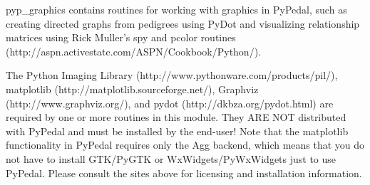 \par pyp\_graphics contains routines for working with graphics in PyPedal, such as
creating directed graphs from pedigrees using PyDot and visualizing relationship
matrices using Rick Muller's spy and pcolor routines
(http://aspn.activestate.com/ASPN/Cookbook/Python/).

The Python Imaging Library (http://www.pythonware.com/products/pil/),
matplotlib (http://matplotlib.sourceforge.net/), Graphviz (http://www.graphviz.org/),
and pydot (http://dkbza.org/pydot.html) are required by one or more routines in this
module.  They ARE NOT distributed with PyPedal and must be installed by the end-user!
Note that the matplotlib functionality in PyPedal requires only the Agg backend, which
means that you do not have to install GTK/PyGTK or WxWidgets/PyWxWidgets just to use
PyPedal.  Please consult the sites above for licensing and installation information.
